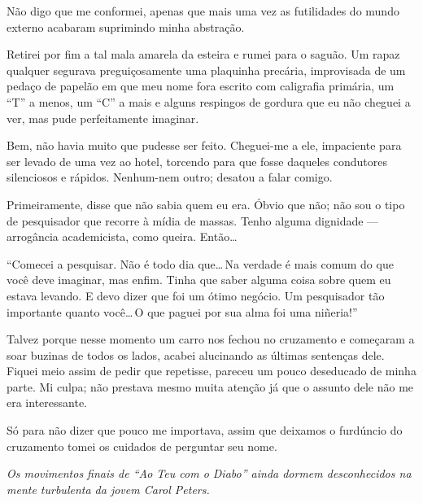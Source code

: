 Não digo que me conformei, apenas que mais uma vez as futilidades do mundo externo acabaram suprimindo minha abstração.

Retirei por fim a tal mala amarela da esteira e rumei para o saguão. Um rapaz qualquer segurava preguiçosamente uma plaquinha precária, improvisada de um pedaço de papelão em que meu nome fora escrito com caligrafia primária, um ``T'' a menos, um ``C'' a mais e alguns respingos de gordura que eu não cheguei a ver, mas pude perfeitamente imaginar.

Bem, não havia muito que pudesse ser feito. Cheguei-me a ele, impaciente para ser levado de uma vez ao hotel, torcendo para que fosse daqueles condutores silenciosos e rápidos. Nenhum-nem outro; desatou a falar comigo.

Primeiramente, disse que não sabia quem eu era. Óbvio que não; não sou o tipo de pesquisador que recorre à mídia de massas. Tenho alguma dignidade --- arrogância academicista, como queira. Então\ldots

``Comecei a pesquisar. Não é todo dia que\ldots\,Na verdade é mais comum do que você deve imaginar, mas enfim. Tinha que saber alguma coisa sobre quem eu estava levando. E devo dizer que foi um ótimo negócio. Um pesquisador tão importante quanto você\ldots\,O que paguei por sua alma foi uma niñeria!''

Talvez porque nesse momento um carro nos fechou no cruzamento e começaram a soar buzinas de todos os lados, acabei alucinando as últimas sentenças dele. Fiquei meio assim de pedir que repetisse, pareceu um pouco deseducado de minha parte. Mi culpa; não prestava mesmo muita atenção já que o assunto dele não me era interessante.

Só para não dizer que pouco me importava, assim que deixamos o furdúncio do cruzamento tomei os cuidados de perguntar seu nome.

	\vspace{3em}

	\begin{center}
	\emph{Os movimentos finais de ``Ao Teu com o Diabo'' ainda dormem desconhecidos na mente turbulenta da jovem Carol Peters.}
	\end{center}
